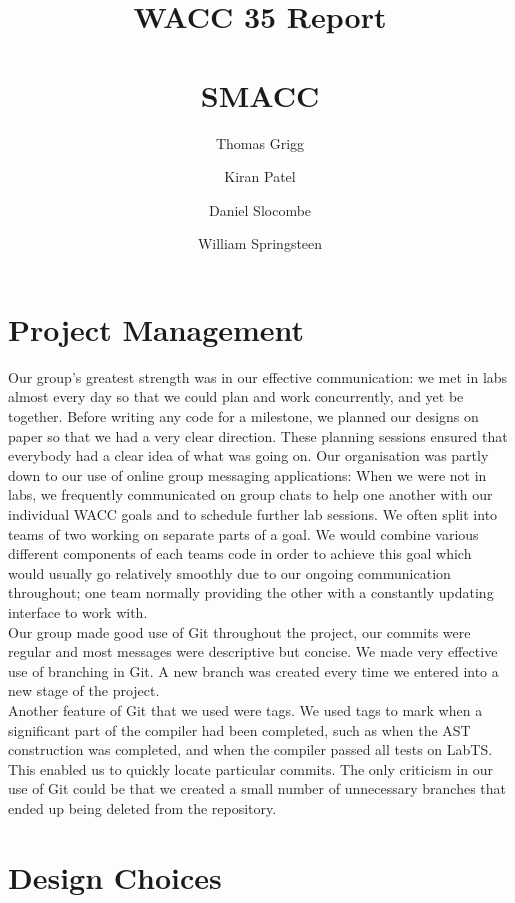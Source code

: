 \documentclass[a4wide, 10pt]{article}
\begin{document}
\title{
  WACC 35 Report \\\quad\\
  \large SMACC}

\author{Thomas Grigg \and Kiran Patel \and Daniel Slocombe \and William Springsteen}
\date{}

\maketitle

\section*{Project Management}

Our group's greatest strength was in our effective communication: we met in labs almost every day so that we could plan and work concurrently, and yet be together. Before writing any code for a milestone, we planned our designs on paper so that we had a very clear direction. These planning sessions ensured that everybody had a clear idea of what was going on. Our organisation was partly down to our use of online group messaging applications: When we were not in labs, we frequently communicated on group chats to help one another with our individual WACC goals and to schedule further lab sessions. We often split into teams of two working on separate parts of a goal. We would combine various different components of each teams code in order to achieve this goal which would usually go relatively smoothly due to our ongoing communication throughout; one team normally providing the other with a constantly updating interface to work with.\\
\indent Our group made good use of Git throughout the project, our commits were regular and most messages were descriptive but concise. We made very effective use of branching in Git. A new branch was created every time we entered into a new stage of the project.\\
Another feature of Git that we used were tags. We used tags to mark when a significant part of the compiler had been completed, such as when the AST construction was completed, and when the compiler passed all tests on LabTS. This enabled us to quickly locate particular commits. The only criticism in our use of Git could be that we created a small number of unnecessary branches that ended up being deleted from the repository. 

\section*{Design Choices}
\end{document}
